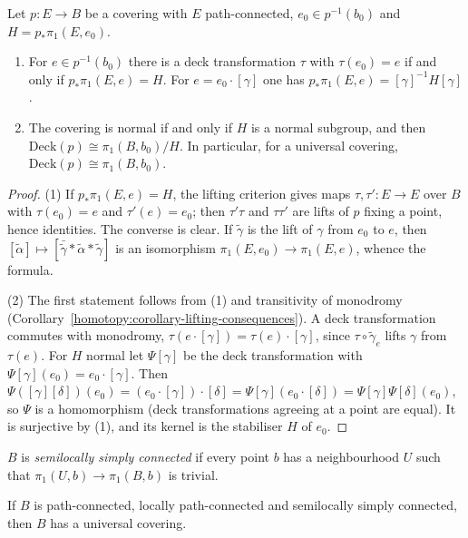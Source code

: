 \begin{proposition}\label{homotopy:proposition-deck}
Let $p \colon E \to B$ be a covering with $E$ path-connected, $e_0 \in p^{-1}(b_0)$ and $H = p_*\pi_1(E, e_0)$.
\begin{enumerate}
\item For $e \in p^{-1}(b_0)$ there is a deck transformation $\tau$ with $\tau(e_0) = e$ if and only if $p_*\pi_1(E, e) = H$. For $e = e_0 \cdot [\gamma]$ one has
$p_*\pi_1(E, e) = [\gamma]^{-1}H[\gamma]$.
\item The covering is normal if and only if $H$ is a normal subgroup, and then $\mathrm{Deck}(p) \cong \pi_1(B, b_0)/H$. In particular, for a universal covering,
$\mathrm{Deck}(p) \cong \pi_1(B, b_0)$.
\end{enumerate}
\end{proposition}

\begin{proof}
(1) If $p_*\pi_1(E, e) = H$, the lifting criterion gives maps $\tau, \tau' \colon E \to E$ over $B$ with $\tau(e_0) = e$ and $\tau'(e) = e_0$; then $\tau'\tau$ and
$\tau\tau'$ are lifts of $p$ fixing a point, hence identities. The converse is clear. If $\tilde\gamma$ is the lift of $\gamma$ from $e_0$ to $e$, then
$[\tilde\alpha] \mapsto [\bar{\tilde\gamma} * \tilde\alpha * \tilde\gamma]$ is an isomorphism $\pi_1(E, e_0) \to \pi_1(E, e)$, whence the formula.

(2) The first statement follows from (1) and transitivity of monodromy (Corollary~\ref{homotopy:corollary-lifting-consequences}). A deck transformation commutes
with monodromy, $\tau(e \cdot [\gamma]) = \tau(e) \cdot [\gamma]$, since $\tau \circ \tilde\gamma_e$ lifts $\gamma$ from $\tau(e)$. For $H$ normal let $\Psi[\gamma]$ be
the deck transformation with $\Psi[\gamma](e_0) = e_0 \cdot [\gamma]$. Then
$\Psi([\gamma][\delta])(e_0) = (e_0 \cdot [\gamma]) \cdot [\delta] = \Psi[\gamma](e_0 \cdot [\delta]) = \Psi[\gamma]\Psi[\delta](e_0)$, so $\Psi$ is a
homomorphism (deck transformations agreeing at a point are equal). It is surjective by (1), and its kernel is the stabiliser $H$ of $e_0$.
\end{proof}

\begin{definition}\label{homotopy:definition-slsc}
$B$ is \emph{semilocally simply connected} if every point $b$ has a neighbourhood $U$ such that $\pi_1(U, b) \to \pi_1(B, b)$ is trivial.
\end{definition}

\begin{theorem}\label{homotopy:theorem-universal-cover}
If $B$ is path-connected, locally path-connected and semilocally simply connected, then $B$ has a universal covering.
\end{theorem}

